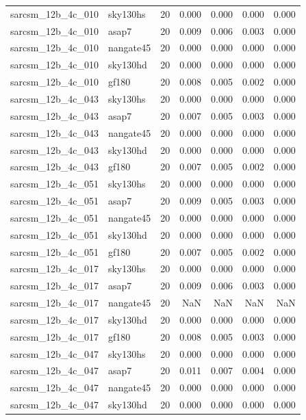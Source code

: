 \begin{tabular}{llrrrrr}
sarcsm\_12b\_4c\_010 & sky130hs & 20 & 0.000 & 0.000 & 0.000 & 0.000 \\
sarcsm\_12b\_4c\_010 & asap7 & 20 & 0.009 & 0.006 & 0.003 & 0.000 \\
sarcsm\_12b\_4c\_010 & nangate45 & 20 & 0.000 & 0.000 & 0.000 & 0.000 \\
sarcsm\_12b\_4c\_010 & sky130hd & 20 & 0.000 & 0.000 & 0.000 & 0.000 \\
sarcsm\_12b\_4c\_010 & gf180 & 20 & 0.008 & 0.005 & 0.002 & 0.000 \\
sarcsm\_12b\_4c\_043 & sky130hs & 20 & 0.000 & 0.000 & 0.000 & 0.000 \\
sarcsm\_12b\_4c\_043 & asap7 & 20 & 0.007 & 0.005 & 0.003 & 0.000 \\
sarcsm\_12b\_4c\_043 & nangate45 & 20 & 0.000 & 0.000 & 0.000 & 0.000 \\
sarcsm\_12b\_4c\_043 & sky130hd & 20 & 0.000 & 0.000 & 0.000 & 0.000 \\
sarcsm\_12b\_4c\_043 & gf180 & 20 & 0.007 & 0.005 & 0.002 & 0.000 \\
sarcsm\_12b\_4c\_051 & sky130hs & 20 & 0.000 & 0.000 & 0.000 & 0.000 \\
sarcsm\_12b\_4c\_051 & asap7 & 20 & 0.009 & 0.005 & 0.003 & 0.000 \\
sarcsm\_12b\_4c\_051 & nangate45 & 20 & 0.000 & 0.000 & 0.000 & 0.000 \\
sarcsm\_12b\_4c\_051 & sky130hd & 20 & 0.000 & 0.000 & 0.000 & 0.000 \\
sarcsm\_12b\_4c\_051 & gf180 & 20 & 0.007 & 0.005 & 0.002 & 0.000 \\
sarcsm\_12b\_4c\_017 & sky130hs & 20 & 0.000 & 0.000 & 0.000 & 0.000 \\
sarcsm\_12b\_4c\_017 & asap7 & 20 & 0.009 & 0.006 & 0.003 & 0.000 \\
sarcsm\_12b\_4c\_017 & nangate45 & 20 & NaN & NaN & NaN & NaN \\
sarcsm\_12b\_4c\_017 & sky130hd & 20 & 0.000 & 0.000 & 0.000 & 0.000 \\
sarcsm\_12b\_4c\_017 & gf180 & 20 & 0.008 & 0.005 & 0.003 & 0.000 \\
sarcsm\_12b\_4c\_047 & sky130hs & 20 & 0.000 & 0.000 & 0.000 & 0.000 \\
sarcsm\_12b\_4c\_047 & asap7 & 20 & 0.011 & 0.007 & 0.004 & 0.000 \\
sarcsm\_12b\_4c\_047 & nangate45 & 20 & 0.000 & 0.000 & 0.000 & 0.000 \\
sarcsm\_12b\_4c\_047 & sky130hd & 20 & 0.000 & 0.000 & 0.000 & 0.000 \\

\end{tabular}
